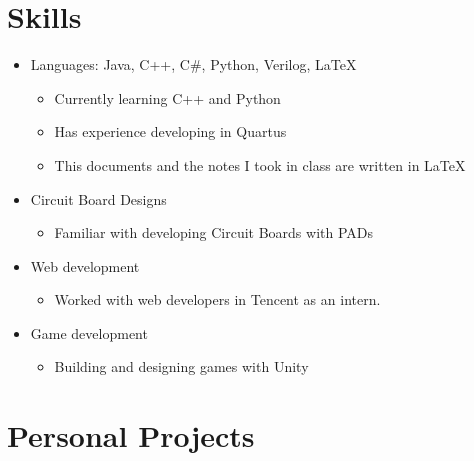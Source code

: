   \section{Skills}

  \begin{itemize}[itemsep=0.1\parskip]
    \item Languages: Java, C++, C\#, Python, Verilog, \LaTeX

    \begin{itemize}
      \item Currently learning C++ and Python
      \item Has experience developing in Quartus
      \item This documents and the notes I took in class are written in \LaTeX
    \end{itemize}

    \item Circuit Board Designs
    \begin{itemize}
      \item Familiar with developing Circuit Boards with PADs
    \end{itemize}

    \item Web development
    \begin{itemize}
      \item Worked with web developers in Tencent as an intern.
    \end{itemize}
    
    \item Game development
    \begin{itemize}
      \item Building and designing games with Unity
    \end{itemize}

  \end{itemize}

  \section{Personal Projects}

  \def\ghurl#1{%
    \href{#1}{({\blueghicon{}})}%
  }

